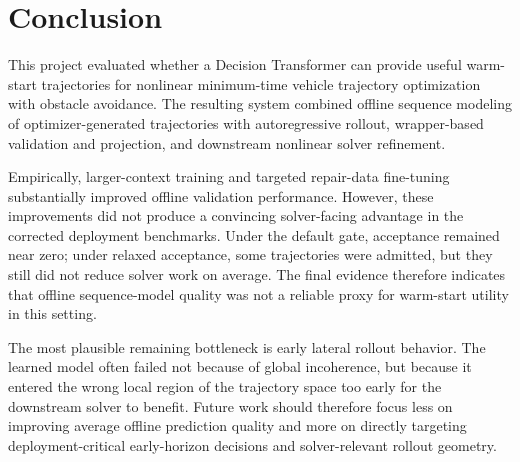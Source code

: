 \section{Conclusion}
\label{sec:conclusion}

This project evaluated whether a Decision Transformer can provide useful warm-start trajectories for nonlinear minimum-time vehicle trajectory optimization with obstacle avoidance. The resulting system combined offline sequence modeling of optimizer-generated trajectories with autoregressive rollout, wrapper-based validation and projection, and downstream nonlinear solver refinement.

Empirically, larger-context training and targeted repair-data fine-tuning substantially improved offline validation performance. However, these improvements did not produce a convincing solver-facing advantage in the corrected deployment benchmarks. Under the default gate, acceptance remained near zero; under relaxed acceptance, some trajectories were admitted, but they still did not reduce solver work on average. The final evidence therefore indicates that offline sequence-model quality was not a reliable proxy for warm-start utility in this setting.

The most plausible remaining bottleneck is early lateral rollout behavior. The learned model often failed not because of global incoherence, but because it entered the wrong local region of the trajectory space too early for the downstream solver to benefit. Future work should therefore focus less on improving average offline prediction quality and more on directly targeting deployment-critical early-horizon decisions and solver-relevant rollout geometry.